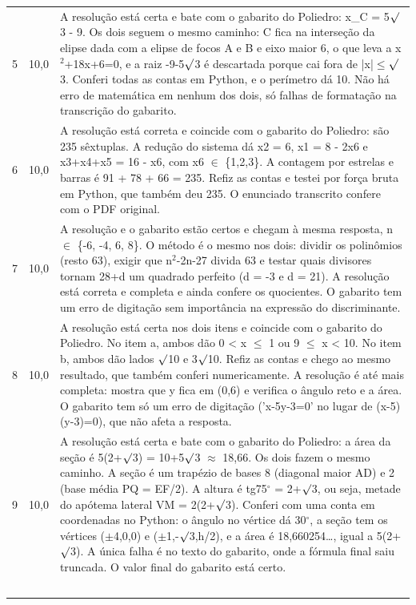 \documentclass{article}%
\begin{document}
\begin{longtable}{@{}c c p{}@{}}
5 & 10,0 & A resolução está certa e bate com o gabarito do Poliedro: x\_C = 5$\surd$3 - 9. Os dois seguem o mesmo caminho: C fica na interseção da elipse dada com a elipse de focos A e B e eixo maior 6, o que leva a x$^2$+18x+6=0, e a raiz -9-5$\surd$3 é descartada porque cai fora de |x|$\leq$$\surd$3. Conferi todas as contas em Python, e o perímetro dá 10. Não há erro de matemática em nenhum dos dois, só falhas de formatação na transcrição do gabarito. \\
6 & 10,0 & A resolução está correta e coincide com o gabarito do Poliedro: são 235 sêxtuplas. A redução do sistema dá x2 = 6, x1 = 8 - 2x6 e x3+x4+x5 = 16 - x6, com x6 $\in$ \{1,2,3\}. A contagem por estrelas e barras é 91 + 78 + 66 = 235. Refiz as contas e testei por força bruta em Python, que também deu 235. O enunciado transcrito confere com o PDF original. \\
7 & 10,0 & A resolução e o gabarito estão certos e chegam à mesma resposta, n $\in$ \{-6, -4, 6, 8\}. O método é o mesmo nos dois: dividir os polinômios (resto 63), exigir que n$^2$-2n-27 divida 63 e testar quais divisores tornam 28+d um quadrado perfeito (d = -3 e d = 21). A resolução está correta e completa e ainda confere os quocientes. O gabarito tem um erro de digitação sem importância na expressão do discriminante. \\
8 & 10,0 & A resolução está certa nos dois itens e coincide com o gabarito do Poliedro. No item a, ambos dão 0 < x $\leq$ 1 ou 9 $\leq$ x < 10. No item b, ambos dão lados $\surd$10 e 3$\surd$10. Refiz as contas e chego ao mesmo resultado, que também conferi numericamente. A resolução é até mais completa: mostra que y fica em (0,6) e verifica o ângulo reto e a área. O gabarito tem só um erro de digitação ('x-5y-3=0' no lugar de (x-5)(y-3)=0), que não afeta a resposta. \\
9 & 10,0 & A resolução está certa e bate com o gabarito do Poliedro: a área da seção é 5(2+$\surd$3) = 10+5$\surd$3 $\approx$ 18,66. Os dois fazem o mesmo caminho. A seção é um trapézio de bases 8 (diagonal maior AD) e 2 (base média PQ = EF/2). A altura é tg75$^\circ$ = 2+$\surd$3, ou seja, metade do apótema lateral VM = 2(2+$\surd$3). Conferi com uma conta em coordenadas no Python: o ângulo no vértice dá 30$^\circ$, a seção tem os vértices ($\pm$4,0,0) e ($\pm$1,-$\surd$3,h/2), e a área é 18,660254\ldots{}, igual a 5(2+$\surd$3). A única falha é no texto do gabarito, onde a fórmula final saiu truncada. O valor final do gabarito está certo. \\
$$
\end{longtable}
\end{document}
